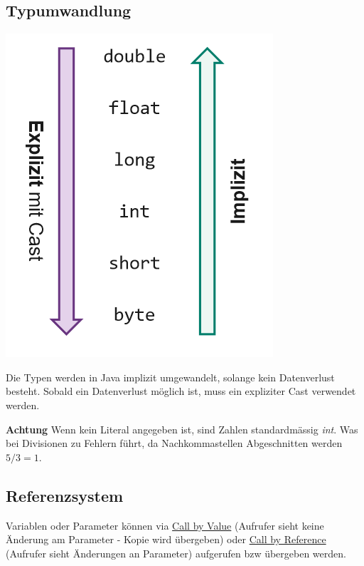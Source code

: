 \subsection{Typumwandlung}
\begin{center}
	\begin{minipage}{0.1\textwidth}
		\includegraphics[width=\columnwidth,keepaspectratio=true]{Images/typumwandling}
	\end{minipage}%
	\begin{minipage}{0.35\textwidth}
		Die Typen werden in Java implizit umgewandelt, solange kein Datenverlust besteht. Sobald ein Datenverlust möglich ist, muss ein expliziter Cast verwendet werden.
	\end{minipage}
\end{center}

\noindent\textbf{Achtung} Wenn kein Literal angegeben ist, sind Zahlen standardmässig \textit{int}. Was bei Divisionen zu Fehlern führt, da Nachkommastellen Abgeschnitten werden $5 / 3 = 1$.

\subsection{Referenzsystem}
Variablen oder Parameter können via \underline{Call by Value} (Aufrufer sieht keine Änderung am Parameter - Kopie wird übergeben) oder \underline{Call by Reference} (Aufrufer sieht Änderungen an Parameter) aufgerufen bzw übergeben werden.\\

